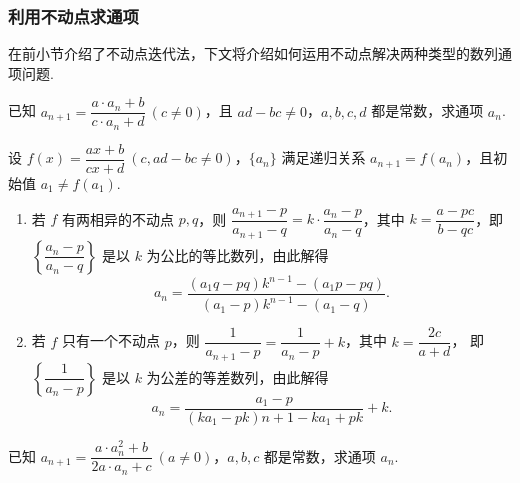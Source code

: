 \subsubsection{利用不动点求通项}

在前小节介绍了不动点迭代法，下文将介绍如何运用不动点解决两种类型的数列通项问题.

\begin{example}
    已知 $a_{n+1}=\dfrac{a\cdot a_n+b}{c\cdot a_n+d}~  (c\not=0)$，且 $ad-bc\not=0$，$a,b,c,d$ 都是常数，求通项 $a_n$.
\end{example}
\begin{solution}
    设 $f(x)=\dfrac{ax+b}{cx+d}~  (c,ad-bc\not=0)$，$\{a_n\}$ 满足递归关系 $a_{n+1}=f(a_n)$，且初始值 $a_1\not=f(a_1)$.
    \begin{enumerate}[label=(\arabic{*})]
        \item 若 $f$ 有两相异的不动点 $p,q$，则 $\dfrac{a_{n+1}-p}{a_{n+1}-q}=k\cdot \dfrac{a_{n}-p}{a_{n}-q}$，其中 $k=\dfrac{a-pc}{b-qc}$，即
              $\left\{\dfrac{a_n-p}{a_n-q}\right\}$ 是以 $k$ 为公比的等比数列，由此解得
              $$a_{n}=\dfrac{\left( a_1q-pq\right) k^{n-1}-\left( a_1p-pq\right) }{\left( a_1-p\right) k^{n-1}-\left( a_1-q\right) }.$$
        \item 若 $f$ 只有一个不动点 $p$，则 $\dfrac{1}{a_{n+1}-p}=\dfrac{1}{a_{n}-p}+k$，其中 $k=\dfrac{2c}{a+d}$，
              即 $\left\{\dfrac{1}{a_n-p}\right\}$ 是以 $k$ 为公差的等差数列，由此解得
              $$a_{n}=\dfrac{a_{1}-p}{\left( ka_{1}-pk\right) n+1-ka_{1}+pk}+k.$$
    \end{enumerate}
\end{solution}
\begin{example}
    已知 $a_{n+1}=\dfrac{a\cdot a_n^2+b}{2a \cdot a_n+c}~  (a\not=0)$，$a,b,c$ 都是常数，求通项 $a_n$.
\end{example}
